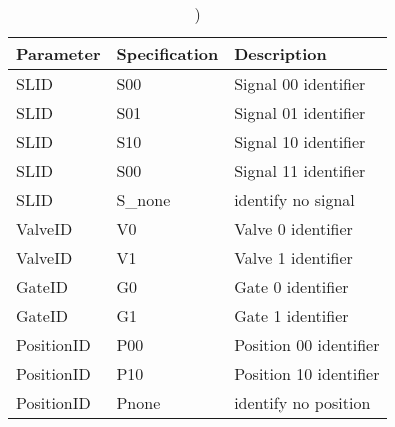 			\begin{table}[htbp]
				\centering
				\caption{)}
				\begin{tabular}{lp{6cm}l}
					\toprule
					\textbf{Parameter} & \textbf{Specification} & \textbf{Description} \\
					\hline
					SLID & S00 &  Signal 00 identifier\\
					SLID & S01 &  Signal 01 identifier\\
					SLID  & S10 &  Signal 10 identifier\\
					SLID  & S00 &  Signal 11 identifier\\
					SLID    & S\_none &  identify no signal\\
					ValveID & V0 &  Valve 0 identifier\\
					ValveID & V1 &  Valve 1 identifier\\
					GateID & G0 &  Gate 0 identifier\\
					GateID & G1 &  Gate 1 identifier\\
					PositionID & P00 &  Position 00 identifier\\
					PositionID & P10 &  Position 10 identifier\\
					PositionID   & Pnone &  identify no position\\
					
				\end{tabular}%
				\label{tab:addlabel}%
			\end{table}%
			
				

				
